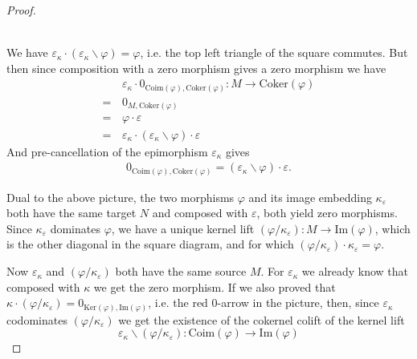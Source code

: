 \begin{proof}
\begin{subproof}[Proof that $(\varepsilon_{\kappa}\backslash \varphi) \cdot \varepsilon = 0_{\mathrm{Coim}(\varphi),\mathrm{Coker}(\varphi)}$]\phantom{}\\
We have $\varepsilon_{\kappa} \cdot (\varepsilon_{\kappa}\backslash \varphi) = \varphi$, i.e. the top left triangle
of the square commutes. But then since composition with a zero morphism gives a zero morphism we have
\begin{align*}
&\varepsilon_{\kappa} \cdot 0_{\mathrm{Coim}(\varphi),\mathrm{Coker}(\varphi)} : M \rightarrow \mathrm{Coker}(\varphi) \\
=\, &0_{M,\mathrm{Coker}(\varphi)} \\
=\, &\varphi \cdot \varepsilon \\
=\, &\varepsilon_{\kappa} \cdot (\varepsilon_{\kappa}\backslash \varphi) \cdot \varepsilon
\end{align*}
And pre-cancellation of the epimorphism $\varepsilon_{\kappa}$ gives
\begin{align*}
0_{\mathrm{Coim}(\varphi),\mathrm{Coker}(\varphi)} = (\varepsilon_{\kappa}\backslash \varphi) \cdot \varepsilon.
\end{align*}
\end{subproof}

Dual to the above picture, the two morphisms $\varphi$ and its image embedding $\kappa_{\varepsilon}$ both have the same
target $N$ and composed with $\varepsilon$, both yield zero morphisms. Since $\kappa_{\varepsilon}$ dominates $\varphi$,
we have a unique kernel lift
$(\varphi / \kappa_{\varepsilon}) : M \rightarrow \mathrm{Im}(\varphi)$, which is the other diagonal in the square diagram,
and for which $(\varphi / \kappa_{\varepsilon})\cdot \kappa_{\varepsilon} = \varphi$.

Now $\varepsilon_{\kappa}$ and $(\varphi / \kappa_{\varepsilon})$ both have the same source $M$. For $\varepsilon_{\kappa}$
we already know that composed with $\kappa$ we get the zero morphism. If we also proved that
$\kappa \cdot (\varphi / \kappa_{\varepsilon}) = 0_{\mathrm{Ker}(\varphi),\mathrm{Im}(\varphi)}$, i.e. the red $0$-arrow in the
picture, then, since $\varepsilon_{\kappa}$ codominates $(\varphi / \kappa_{\varepsilon})$ we get the existence of the
cokernel colift of the kernel lift
\[
\varepsilon_{\kappa}\backslash(\varphi/\kappa_{\varepsilon}) : \mathrm{Coim}(\varphi) \rightarrow \mathrm{Im}(\varphi)
\]


\end{proof}
